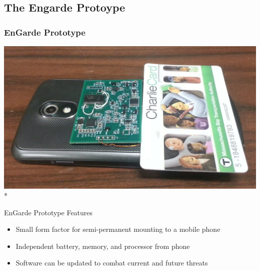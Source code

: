 \documentclass[unknownkeysallowed]{beamer}
\begin{document}
\subsection{The Engarde Protoype}
\begin{frame}
\frametitle{EnGarde Prototype}
\begin{center}
   \includegraphics[width=.5\linewidth,height=\textheight,keepaspectratio]{figures/engarde/engarde.jpg}\\*

   \begin{minipage}{.9\textwidth}
     \vspace{3mm}
     \pause
   \begin{block}{EnGarde Prototype Features}
     \begin{itemize}
       \pause
       \item{Small form factor for semi-permanent mounting to a mobile phone}
       \pause
       \item{Independent battery, memory, and processor from phone}
       \pause
       \item{Software can be updated to combat current and future threats}
     \end{itemize}
   \end{block}
   \end{minipage}
\end{center}
\end{frame}
\end{document}
